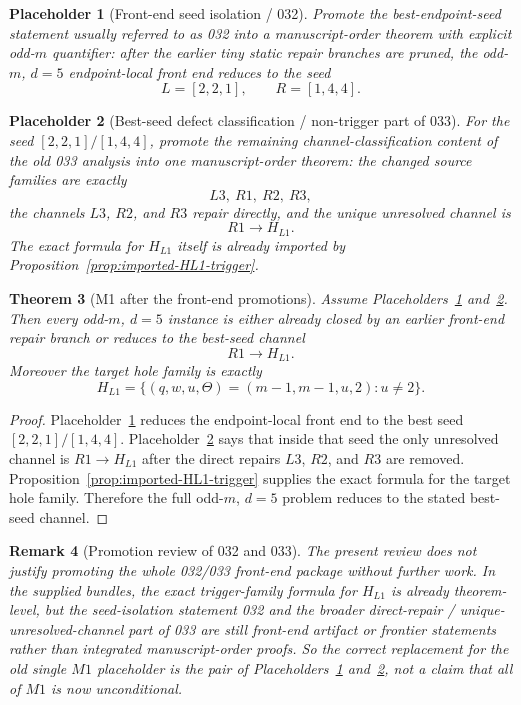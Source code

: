 \documentclass[11pt]{article}
\newtheorem{theorem}{Theorem}[section]
\newtheorem{remark}[theorem]{Remark}
\newtheorem{placeholder}[theorem]{Placeholder}
\begin{document}
\begin{placeholder}[Front-end seed isolation / \textup{032}]
\label{ph:032}
Promote the best-endpoint-seed statement usually referred to as \textup{032}
into a manuscript-order theorem with explicit odd-$m$ quantifier: after the
earlier tiny static repair branches are pruned, the odd-$m$, $d=5$
endpoint-local front end reduces to the seed
\[
L=[2,2,1], \qquad R=[1,4,4].
\]
\end{placeholder}

\begin{placeholder}[Best-seed defect classification / non-trigger part of \textup{033}]
\label{ph:033-class}
For the seed $[2,2,1]/[1,4,4]$, promote the remaining channel-classification
content of the old \textup{033} analysis into one manuscript-order theorem: the
changed source families are exactly
\[
L3,\ R1,\ R2,\ R3,
\]
the channels $L3$, $R2$, and $R3$ repair directly, and the unique unresolved
channel is
\[
R1\to H_{L1}.
\]
The exact formula for $H_{L1}$ itself is already imported by
Proposition~\ref{prop:imported-HL1-trigger}.
\end{placeholder}

\begin{theorem}[M1 after the front-end promotions]
\label{thm:M1-from-032-and-033class}
Assume Placeholders~\ref{ph:032} and~\ref{ph:033-class}.
Then every odd-$m$, $d=5$ instance is either already closed by an earlier
front-end repair branch or reduces to the best-seed channel
\[
R1\to H_{L1}.
\]
Moreover the target hole family is exactly
\[
H_{L1}=
\{(q,w,u,\Theta)=(m-1,m-1,u,2): u\neq 2\}.
\]
\end{theorem}

\begin{proof}
Placeholder~\ref{ph:032} reduces the endpoint-local front end to the best seed
$[2,2,1]/[1,4,4]$.
Placeholder~\ref{ph:033-class} says that inside that seed the only unresolved
channel is $R1\to H_{L1}$ after the direct repairs $L3$, $R2$, and $R3$ are
removed.
Proposition~\ref{prop:imported-HL1-trigger} supplies the exact formula for the
target hole family.
Therefore the full odd-$m$, $d=5$ problem reduces to the stated best-seed
channel.
\end{proof}

\begin{remark}[Promotion review of \textup{032} and \textup{033}]
The present review does \emph{not} justify promoting the whole
\textup{032}/\textup{033} front-end package without further work.
In the supplied bundles, the exact trigger-family formula for $H_{L1}$ is
already theorem-level, but the seed-isolation statement \textup{032} and the
broader direct-repair / unique-unresolved-channel part of \textup{033} are
still front-end artifact or frontier statements rather than integrated
manuscript-order proofs.
So the correct replacement for the old single $M1$ placeholder is the pair of
Placeholders~\ref{ph:032} and~\ref{ph:033-class}, not a claim that all of $M1$
is now unconditional.
\end{remark}
\end{document}
